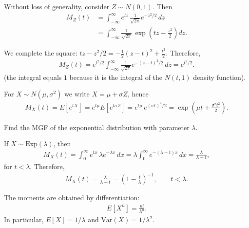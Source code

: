 \begin{solucion}
Without loss of generality, consider $Z \sim N(0,1)$. Then
\begin{align}
 M_Z(t) &= \int_{-\infty}^{\infty} e^{tz}\,\frac{1}{\sqrt{2\pi}}e^{-z^2/2}\,dz \\
 &= \int_{-\infty}^{\infty} \frac{1}{\sqrt{2\pi}}\,\exp\!\left(tz - \frac{z^2}{2}\right)dz.
\end{align}

We complete the square: $tz - z^2/2 = -\frac{1}{2}(z - t)^2 + \frac{t^2}{2}$. Therefore,
\begin{align}
 M_Z(t) = e^{t^2/2}\int_{-\infty}^{\infty} \frac{1}{\sqrt{2\pi}}e^{-(z-t)^2/2}\,dz = e^{t^2/2}.
\end{align}
(the integral equals $1$ because it is the integral of the $N(t, 1)$ density function).

For $X \sim N(\mu,\sigma^2)$ we write $X = \mu + \sigma Z$, hence
\begin{align}
 \label{eq:2.8.14}
 M_X(t) = E[e^{tX}] = e^{t\mu}E[e^{t\sigma Z}] = e^{t\mu}\,e^{(\sigma t)^2/2}
 = \exp\!\left(\mu t + \frac{\sigma^2 t^2}{2}\right).
\end{align}
\end{solucion}

\begin{ejemplo}
 \label{exmp:2.8.6}
Find the MGF of the exponential distribution with parameter $\lambda$.
\end{ejemplo}

\begin{solucion}
If $X \sim \text{Exp}(\lambda)$, then
\begin{align}
 M_X(t) = \int_0^\infty e^{tx}\,\lambda e^{-\lambda x}\,dx
 = \lambda\int_0^\infty e^{-(\lambda - t)x}\,dx = \frac{\lambda}{\lambda - t},
\end{align}
for $t < \lambda$. Therefore,
\begin{align}
 \label{eq:2.8.15}
 M_X(t) = \frac{\lambda}{\lambda - t} = \left(1 - \frac{t}{\lambda}\right)^{-1},
 \qquad t < \lambda.
\end{align}

The moments are obtained by differentiation:
\begin{align}
 E[X^n] = \frac{n!}{\lambda^n}.
\end{align}
In particular, $E[X] = 1/\lambda$ and $\text{Var}(X) = 1/\lambda^2$.
\end{solucion}




